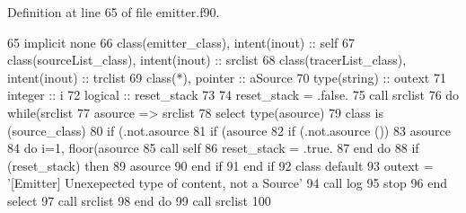 Definition at line 65 of file emitter.\+f90.


\begin{DoxyCode}
65     \textcolor{keywordtype}{implicit none}
66     \textcolor{keywordtype}{class}(emitter\_class), \textcolor{keywordtype}{intent(inout)} :: self
67     \textcolor{keywordtype}{class}(sourceList\_class), \textcolor{keywordtype}{intent(inout)}  :: srclist
68     \textcolor{keywordtype}{class}(tracerList\_class), \textcolor{keywordtype}{intent(inout)}  :: trclist
69     \textcolor{keywordtype}{class}(*), \textcolor{keywordtype}{pointer} :: aSource
70     \textcolor{keywordtype}{type}(string) :: outext
71     \textcolor{keywordtype}{integer} :: i
72     \textcolor{keywordtype}{logical} :: reset\_stack
73 
74     reset\_stack = .false.
75     \textcolor{keyword}{call }srclist%
76     \textcolor{keywordflow}{do} \textcolor{keywordflow}{while}(srclist%
77         asource => srclist%
78         \textcolor{keywordflow}{select type}(asource)
79 \textcolor{keywordflow}{        class is} (source\_class)
80             \textcolor{keywordflow}{if} (.not.asource%
81             \textcolor{keywordflow}{if} (asource%
82                 \textcolor{keywordflow}{if} (.not.asource%
      ())                
83                 asource%
84                 \textcolor{keywordflow}{do} i=1, floor(asource%
85                     \textcolor{keyword}{call }self%
86                     reset\_stack = .true.                    
87 \textcolor{keywordflow}{                end do} 
88                 \textcolor{keywordflow}{if} (reset\_stack) \textcolor{keywordflow}{then}
89                     asource%
90 \textcolor{keywordflow}{                end if}
91 \textcolor{keywordflow}{            end if}
92 \textcolor{keywordflow}{            class default}
93             outext = \textcolor{stringliteral}{'[Emitter] Unexepected type of content, not a Source'}
94             \textcolor{keyword}{call }log%
95             stop
96 \textcolor{keywordflow}{        end select}
97         \textcolor{keyword}{call }srclist%
98 \textcolor{keywordflow}{    end do}
99     \textcolor{keyword}{call }srclist%
100 
\end{DoxyCode}
\mbox{\label{namespaceemitter__mod_a942679c07927fa594173fdd02da38922}} 
